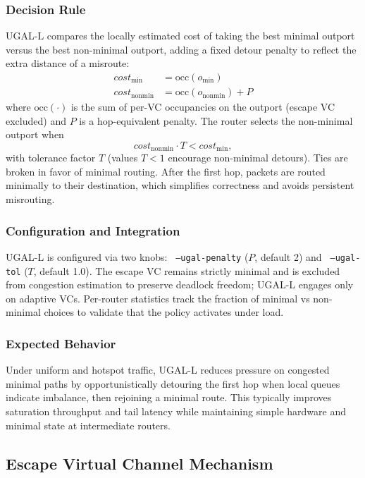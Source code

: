\documentclass[11pt]{article}
\begin{document}
\subsubsection{Decision Rule}
UGAL-L compares the locally estimated cost of taking the best minimal outport versus the best non-minimal outport, adding a fixed detour penalty to reflect the extra distance of a misroute:
\begin{align}
\mathit{cost}_{\min} &= \mathrm{occ}(o_{\min}) \\
\mathit{cost}_{\mathrm{nonmin}} &= \mathrm{occ}(o_{\mathrm{nonmin}}) + P
\end{align}
where $\mathrm{occ}(\cdot)$ is the sum of per-VC occupancies on the outport (escape VC excluded) and $P$ is a hop-equivalent penalty. The router selects the non-minimal outport when
\begin{equation}
 \mathit{cost}_{\mathrm{nonmin}} \cdot T < \mathit{cost}_{\min},
\end{equation}
with tolerance factor $T$ (values $T{<}1$ encourage non-minimal detours). Ties are broken in favor of minimal routing. After the first hop, packets are routed minimally to their destination, which simplifies correctness and avoids persistent misrouting.

\subsubsection{Configuration and Integration}
UGAL-L is configured via two knobs: \texttt{\,--ugal-penalty} ($P$, default 2) and \texttt{\,--ugal-tol} ($T$, default 1.0). The escape VC remains strictly minimal and is excluded from congestion estimation to preserve deadlock freedom; UGAL-L engages only on adaptive VCs. Per-router statistics track the fraction of minimal vs non-minimal choices to validate that the policy activates under load.

\subsubsection{Expected Behavior}
Under uniform and hotspot traffic, UGAL-L reduces pressure on congested minimal paths by opportunistically detouring the first hop when local queues indicate imbalance, then rejoining a minimal route. This typically improves saturation throughput and tail latency while maintaining simple hardware and minimal state at intermediate routers.

\subsection{Escape Virtual Channel Mechanism}
\end{document}

